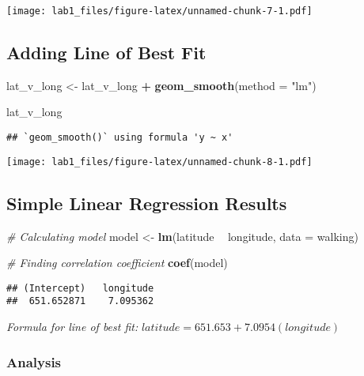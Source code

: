 \documentclass[
]{article}
\newenvironment{Shaded}{\begin{snugshade}}{\end{snugshade}}
\newcommand{\CommentTok}[1]{\textcolor[rgb]{0.56,0.35,0.01}{\textit{#1}}}
\newcommand{\DataTypeTok}[1]{\textcolor[rgb]{0.13,0.29,0.53}{#1}}
\newcommand{\KeywordTok}[1]{\textcolor[rgb]{0.13,0.29,0.53}{\textbf{#1}}}
\newcommand{\NormalTok}[1]{#1}
\newcommand{\OperatorTok}[1]{\textcolor[rgb]{0.81,0.36,0.00}{\textbf{#1}}}
\newcommand{\StringTok}[1]{\textcolor[rgb]{0.31,0.60,0.02}{#1}}
\begin{document}
\texttt{[image: lab1\_files/figure-latex/unnamed-chunk-7-1.pdf]}

\hypertarget{adding-line-of-best-fit}{%
\subsection{Adding Line of Best Fit}\label{adding-line-of-best-fit}}

\begin{Shaded}
\begin{Highlighting}[]
\NormalTok{lat_v_long <-}\StringTok{ }\NormalTok{lat_v_long }\OperatorTok{+}
\StringTok{  }\KeywordTok{geom_smooth}\NormalTok{(}\DataTypeTok{method =} \StringTok{"lm"}\NormalTok{)}

\NormalTok{lat_v_long}
\end{Highlighting}
\end{Shaded}

\begin{verbatim}
## `geom_smooth()` using formula 'y ~ x'
\end{verbatim}

\texttt{[image: lab1\_files/figure-latex/unnamed-chunk-8-1.pdf]}

\hypertarget{simple-linear-regression-results}{%
\subsection{Simple Linear Regression
Results}\label{simple-linear-regression-results}}

\begin{Shaded}
\begin{Highlighting}[]
\CommentTok{# Calculating model}
\NormalTok{model <-}\StringTok{ }\KeywordTok{lm}\NormalTok{(latitude }\OperatorTok{~}\StringTok{ }\NormalTok{longitude, }\DataTypeTok{data =}\NormalTok{ walking)}

\CommentTok{# Finding correlation coefficient}
\KeywordTok{coef}\NormalTok{(model)}
\end{Highlighting}
\end{Shaded}

\begin{verbatim}
## (Intercept)   longitude 
##  651.652871    7.095362
\end{verbatim}

\emph{Formula for line of best fit:} \n
\(latitude = 651.653 + 7.0954(longitude)\)

\hypertarget{analysis-1}{%
\subsubsection{Analysis}\label{analysis-1}}
\end{document}

